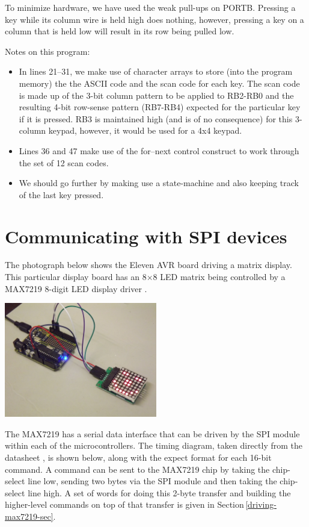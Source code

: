 \documentclass[12pt,a4paper]{article}
\newcommand{\code}[2]{
 \hrulefill
 \scriptsize
 
 \hrulefill
 \vspace{2em}
 \normalsize
}
\begin{document}
\medskip\noindent
To minimize hardware, we have used the weak pull-ups on PORTB.
Pressing a key while its column wire is held high does nothing, however,
pressing a key on a column that is held low will result in its row
being pulled low.

\bigskip\noindent
\code{}{../pic18/keypad.txt}

\noindent
Notes on this program:
\begin{itemize}
  \item In lines 21--31, we make use of character arrays to store (into the program memory)
    the the ASCII code and the scan code for each key.
    The scan code is made up of the 3-bit column pattern to be applied to RB2-RB0 and the
    resulting 4-bit row-sense pattern (RB7-RB4) expected for the particular key if it is pressed.
    RB3 is maintained high (and is of no consequence) for this 3-column keypad, however, 
    it would be used for a 4x4 keypad.
  \item Lines 36 and 47 make use of the for--next control construct to work through 
    the set of 12 scan codes.
  \item We should go further by making use a state-machine 
    and also keeping track of the last key pressed.
\end{itemize}


\newpage
\section{Communicating with SPI devices}
%
The photograph below shows the Eleven AVR board driving a matrix display.
This particular display board has an 8$\times$8 LED matrix being controlled by
a MAX7219 8-digit LED display driver \cite{max7219-datasheet}.

\medskip
\centerline{
\includegraphics[height=5cm]{../figs/eleven-driving-MAX7219-LED-matrix.jpeg}
}

\medskip\noindent
The MAX7219 has a serial data interface that can be driven by the SPI module
within each of the microcontrollers.
The timing diagram, taken directly from the datasheet \cite{max7219-datasheet}, 
is shown below, along with the expect format for each 16-bit command.
A command can be sent to the MAX7219 chip by taking the chip-select line low,
sending two bytes via the SPI module and then taking the chip-select line high.
A set of words for doing this 2-byte transfer and building the higher-level commands
on top of that transfer is given in Section\,\ref{driving-max7219-sec}.
\end{document}
